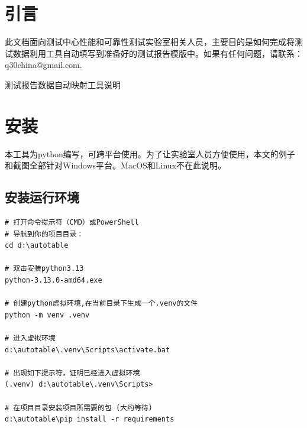 


\section{引言}
此文档面向测试中心性能和可靠性测试实验室相关人员，主要目的是如何完成将测试数据利用工具自动填写到准备好的测试报告模版中。如果有任何问题，请联系：q30china@gmail.com. 


\vspace*{0.2cm}
\begin{center}
    \Huge 测试报告数据自动映射工具说明
\end{center}
\vspace{0cm}

\section{安装}

本工具为python编写，可跨平台使用。为了让实验室人员方便使用，本文的例子和截图全部针对Windows平台。MacOS和Linux不在此说明。

\subsection{安装运行环境}

\begin{lstlisting}
# 打开命令提示符（CMD）或PowerShell
# 导航到你的项目目录：
cd d:\autotable

# 双击安装python3.13
python-3.13.0-amd64.exe

# 创建python虚拟环境,在当前目录下生成一个.venv的文件
python -m venv .venv

# 进入虚拟环境
d:\autotable\.venv\Scripts\activate.bat

# 出现如下提示符，证明已经进入虚拟环境
(.venv) d:\autotable\.venv\Scripts>

# 在项目目录安装项目所需要的包 (大约等待)
d:\autotable\pip install -r requirements

\end{lstlisting}

